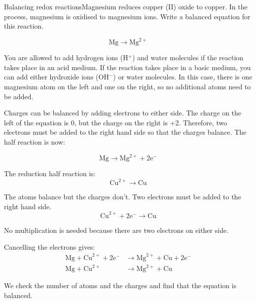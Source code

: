 \begin{wex}{Balancing redox reactions}{Magnesium reduces copper (II) oxide to copper. In the process, magnesium is oxidised to magnesium ions. Write a balanced equation for this reaction.}
{
  \begin{equation*}
    \text{Mg} \rightarrow \text{Mg}^{2+}
  \end{equation*}

You are allowed to add hydrogen ions (H$^{+}$) and water molecules if the reaction takes place in an acid medium. If the reaction takes place in a basic medium, you can add either hydroxide ions (OH$^{-}$) or water molecules. In this case, there is one magnesium atom on the left and one on the right, so no additional atoms need to be added.

Charges can be balanced by adding electrons to either side. The charge on the left of the equation is 0, but the charge on the right is +2. Therefore, two electrons must be added to the right hand side so that the charges balance. The half reaction is now:

\begin{equation*}
  \text{Mg} \rightarrow \text{Mg}^{2+} + 2\text{e}^{-}
\end{equation*}

The reduction half reaction is:
\begin{equation*}
  \text{Cu}^{2+} \rightarrow \text{Cu}
\end{equation*}

The atoms balance but the charges don't. Two electrons must be added to the right hand side.
\begin{equation*}
  \text{Cu}^{2+} + 2\text{e}^{-} \rightarrow \text{Cu}
\end{equation*}

No multiplication is needed because there are two electrons on either
side.

Cancelling the electrons gives:
\begin{align*}
  \text{Mg} + \text{Cu}^{2+} + 2\text{e}^{-} &\rightarrow \text{Mg}^{2+} + \text{Cu} + 2\text{e}^{-} \\
  \text{Mg} + \text{Cu}^{2+} &\rightarrow \text{Mg}^{2+} + \text{Cu}
\end{align*}

We check the number of atoms and the charges and find that the equation is balanced.
}
\end{wex}


